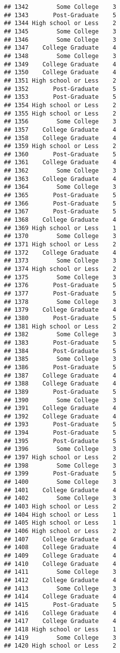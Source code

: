 \documentclass[
]{article}
\begin{document}
\begin{verbatim}
## 1342        Some College    3
## 1343       Post-Graduate    5
## 1344 High school or Less    2
## 1345        Some College    3
## 1346        Some College    3
## 1347    College Graduate    4
## 1348        Some College    3
## 1349    College Graduate    4
## 1350    College Graduate    4
## 1351 High school or Less    2
## 1352       Post-Graduate    5
## 1353       Post-Graduate    5
## 1354 High school or Less    2
## 1355 High school or Less    2
## 1356        Some College    3
## 1357    College Graduate    4
## 1358    College Graduate    4
## 1359 High school or Less    2
## 1360       Post-Graduate    5
## 1361    College Graduate    4
## 1362        Some College    3
## 1363    College Graduate    4
## 1364        Some College    3
## 1365       Post-Graduate    5
## 1366       Post-Graduate    5
## 1367       Post-Graduate    5
## 1368    College Graduate    4
## 1369 High school or Less    1
## 1370        Some College    3
## 1371 High school or Less    2
## 1372    College Graduate    4
## 1373        Some College    3
## 1374 High school or Less    2
## 1375        Some College    3
## 1376       Post-Graduate    5
## 1377       Post-Graduate    5
## 1378        Some College    3
## 1379    College Graduate    4
## 1380       Post-Graduate    5
## 1381 High school or Less    2
## 1382        Some College    3
## 1383       Post-Graduate    5
## 1384       Post-Graduate    5
## 1385        Some College    3
## 1386       Post-Graduate    5
## 1387    College Graduate    4
## 1388    College Graduate    4
## 1389       Post-Graduate    5
## 1390        Some College    3
## 1391    College Graduate    4
## 1392    College Graduate    4
## 1393       Post-Graduate    5
## 1394       Post-Graduate    5
## 1395       Post-Graduate    5
## 1396        Some College    3
## 1397 High school or Less    2
## 1398        Some College    3
## 1399       Post-Graduate    5
## 1400        Some College    3
## 1401    College Graduate    4
## 1402        Some College    3
## 1403 High school or Less    2
## 1404 High school or Less    1
## 1405 High school or Less    1
## 1406 High school or Less    2
## 1407    College Graduate    4
## 1408    College Graduate    4
## 1409    College Graduate    4
## 1410    College Graduate    4
## 1411        Some College    3
## 1412    College Graduate    4
## 1413        Some College    3
## 1414    College Graduate    4
## 1415       Post-Graduate    5
## 1416    College Graduate    4
## 1417    College Graduate    4
## 1418 High school or Less    1
## 1419        Some College    3
## 1420 High school or Less    2

\end{verbatim}
\end{document}
